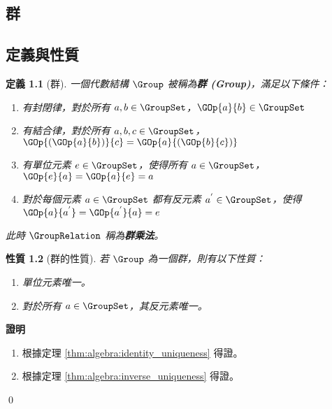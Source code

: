 \documentclass[12pt,a4paper,oneside]{report}
\begin{document}
\begin{CJK}{UTF8}{bkai}
\newtheorem{mydef}{定義}[chapter]
\newtheorem*{mydef*}{定義}
\newtheorem{myrule}[mydef]{原理}
\newtheorem{mythm}[mydef]{定理}
\newtheorem{mylma}[mydef]{引理}
\newtheorem{mypropo}[mydef]{性質}
\newtheorem{mycorol}[mydef]{推論}
\newtheorem{myexample}[mydef]{範例}
\newtheorem*{mynote*}{註}
\renewenvironment{proof}{\textbf{證明}}{\qed}
\newenvironment{mysol}{\textbf{解答}}{\qed}


\fi

\chapter{群}
\section{定義與性質}

\begin{mydef}[群]
\label{def:group:group}
一個代數結構 $\Group$ 被稱為\textbf{群 (Group)}，滿足以下條件：
\begin{enumerate}[label=(G\arabic*),labelindent=\parindent,leftmargin=*]
\item \label{def:group:g1} 有封閉律，對於所有 $a,b\in{\GroupSet}$，$\GOp{a}{b}\in{\GroupSet}$
\item \label{def:group:g2} 有結合律，對於所有 $a,b,c\in{\GroupSet}$，$\GOp{(\GOp{a}{b})}{c}=\GOp{a}{(\GOp{b}{c})}$
\item \label{def:group:g3} 有單位元素 $e\in{\GroupSet}$，使得所有 $a\in{\GroupSet}$，$\GOp{e}{a}=\GOp{a}{e}=a$
\item \label{def:group:g4} 對於每個元素 $a\in{\GroupSet}$ 都有反元素 $a^{'}\in{\GroupSet}$，使得 $\GOp{a}{a^{'}}=\GOp{a^{'}}{a}=e$
\end{enumerate}
此時 $\GroupRelation$ 稱為\textbf{群乘法}。
\end{mydef}

\begin{mypropo}[群的性質]
\label{pro_group_identity_inverse}
若 $\Group$ 為一個群，則有以下性質：
\begin{enumerate}
\item 單位元素唯一。
\item 對於所有 $a\in{\GroupSet}$，其反元素唯一。
\end{enumerate}
\end{mypropo}
\begin{proof}
\begin{enumerate}
\item 根據定理 \ref{thm:algebra:identity_uniqueness} 得證。
\item 根據定理 \ref{thm:algebra:inverse_uniqueness} 得證。
\end{enumerate}
\end{proof}


\end{CJK}
\end{document}
